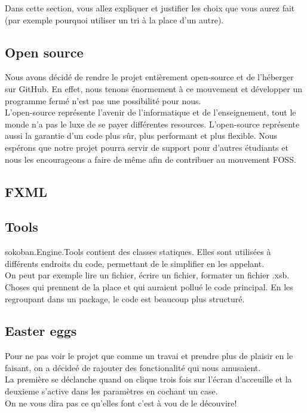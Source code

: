 \documentclass[../main.tex]{subfiles}
\begin{document}
Dans cette section, vous allez expliquer et justifier les choix que vous aurez fait (par exemple pourquoi utiliser un tri à la place d'un autre).

\subsection{Open source}
Nous avons décidé de rendre le projet entièrement open-source et de l'héberger sur GitHub. 
En effet, nous tenons énormement à ce mouvement et développer un programme fermé n'est pas une possibilité pour nous. \\

L'open-source représente l'avenir de l'informatique et de l'enseignement, tout le monde n'a pas le luxe de se payer différentes resources.
L'open-source représente aussi la garantie d'un code plus sûr, plus performant et plus flexible.
Nous espérons que notre projet pourra servir de support pour d'autres étudiants et nous les encourageons a faire de même 
afin de contribuer au mouvement FOSS.

\subsection{FXML}

\subsection{Tools}
sokoban.Engine.Tools contient des classes statiques. Elles sont utilisées à différents endroits du code, permettant de le simplifier en les appelant. \\

On peut par exemple lire un fichier, écrire un fichier, formater un fichier .xsb. Choses qui prennent de la place et qui auraient pollué le code principal. En les regroupant dans un package, le code est beaucoup plus structuré.

\subsection{Easter eggs}
Pour ne pas voir le projet que comme un travai et prendre plus de plaisir en le faisant, on a décideé de rajouter des fonctionalité qui nous amusaient.\\
La première se déclanche quand on clique trois fois sur l'écran d'acceuille et la deuxieme s'active dans les paramètres en cochant un case.\\
On ne vous dira pas ce qu'elles font c'est à vou de le découvire!
\end{document}
